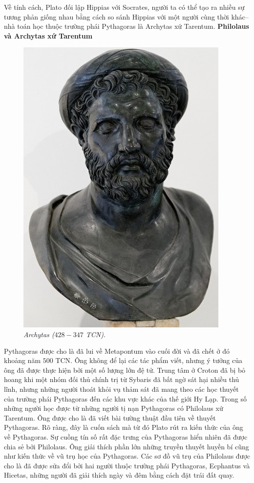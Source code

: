 \begin{multicols}{2}
	\vskip 0.05cm
	Về tính cách, Plato đối lập Hippias với Socrates, người ta có thể tạo ra nhiều sự tương phản giống nhau bằng cách so sánh Hippias với một người cùng thời khác--nhà toán học thuộc trường phái Pythagoras là Archytas xứ Tarentum.
	\vskip 0.05cm
	\textbf{\color{lichsutoanhoc}Philolaus và Archytas xứ Tarentum}
	\begin{figure}[H]
		\vspace*{-5pt}
		\centering
		\captionsetup{labelformat= empty, justification=centering}
		\includegraphics[width= 0.65\linewidth]{2}
		\caption{\small\textit{\color{lichsutoanhoc}Archytas ($428-347$ TCN).}}
		\vspace*{-10pt}
	\end{figure}
	Pythagoras được cho là đã lui về Metapontum vào cuối đời và đã chết ở đó khoảng năm $500$ TCN.  Ông không để lại các tác phẩm viết, nhưng ý tưởng của ông đã được thực hiện bởi một số lượng lớn đệ tử. Trung tâm ở Croton đã bị bỏ hoang khi một nhóm đối thủ chính trị từ Sybaris đã bất ngờ sát hại nhiều thủ lĩnh, nhưng những người thoát khỏi vụ thảm sát đã mang theo các học thuyết của trường phái Pythagoras đến các khu vực khác của thế giới Hy Lạp. Trong số những người học được từ những người tị nạn Pythagoras có Philolaus xứ Tarentum. Ông được cho là đã viết bài tường thuật đầu tiên về thuyết Pythagoras.  Rõ ràng, đây là cuốn sách mà từ đó Plato rút ra kiến thức của ông về Pythagoras.  
	\vskip 0.05cm
	Sự cuồng tín số rất đặc trưng của Pythagoras hiển nhiên đã được chia sẻ bởi Philolaus. Ông giải thích phần lớn những truyền thuyết huyền bí cũng như kiến thức về vũ trụ học của Pythagoras. Các sơ đồ vũ trụ của Philolaus được cho là đã được sửa đổi bởi hai người thuộc trường phái Pythagoras, Ecphantus và Hicetas, những người đã giải thích ngày và đêm bằng cách đặt trái đất quay.  

\end{multicols}
